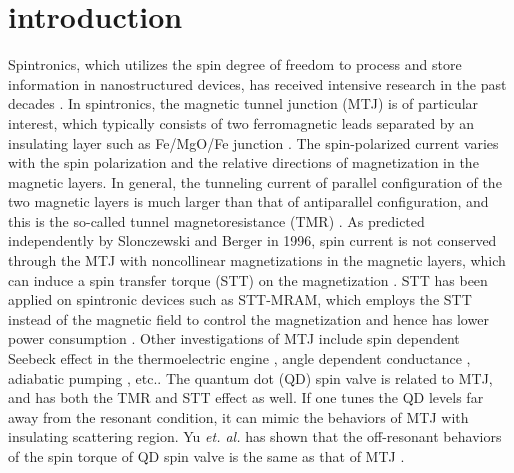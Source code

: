 \documentclass[aps,prb,twocolumn,footinbib,showpacs,superscriptaddress,preprintnumbers,amsmath,amssymb]{revtex4-1}
\begin{document}
\maketitle

\section{introduction}
Spintronics, which utilizes the spin degree of freedom to process and store information in nanostructured devices, has received intensive research in the past decades \cite{spin1, spin2, spin3}. In spintronics, the magnetic tunnel junction (MTJ) is of particular interest, which typically consists of two ferromagnetic leads separated by an insulating layer such as Fe/MgO/Fe junction \cite{MTJ1, MTJ2, KGong}. The spin-polarized current varies with the spin polarization and the relative directions of magnetization in the magnetic layers. In general, the tunneling current of parallel configuration of the two magnetic layers is much larger than that of antiparallel configuration, and this is the so-called tunnel magnetoresistance (TMR) \cite{TMR1, TMR2, TMR3, TMR4, TMR5, KGong}. As predicted independently by Slonczewski \cite{STT1} and Berger \cite{STT2} in 1996, spin current is not conserved through the MTJ with noncollinear magnetizations in the magnetic layers, which can induce a spin transfer torque (STT) on the magnetization \cite{Theodonis1, Theodonis2, Theodonis3, STT11, STT22}. STT has been applied on spintronic devices such as STT-MRAM, which employs the STT instead of the magnetic field to control the magnetization and hence has lower power consumption \cite{STT3}. Other investigations of MTJ include spin dependent Seebeck effect in the thermoelectric engine \cite{DiVentra, Barnas, Bauer2, Bauer3, gm5}, angle dependent conductance \cite{angle1, angle2, angle3}, adiabatic pumping \cite{pump, FCS-STT}, etc.. The quantum dot (QD) spin valve is related to MTJ, and has both the TMR and STT effect as well. If one tunes the QD levels far away from the resonant condition, it can mimic the behaviors of MTJ with insulating scattering region. Yu {\it et. al.} has shown that the off-resonant behaviors of the spin torque of QD spin valve is the same as that of MTJ \cite{YunjinYu}. 
\end{document}

